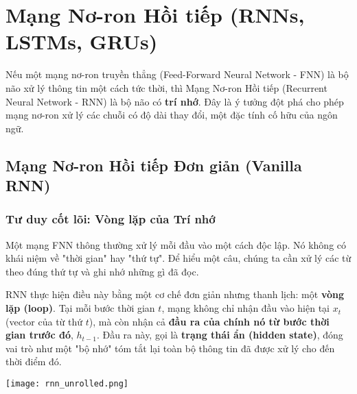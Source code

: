 
\section{Mạng Nơ-ron Hồi tiếp (RNNs, LSTMs, GRUs)}
\label{sec:rnns}

Nếu một mạng nơ-ron truyền thẳng (Feed-Forward Neural Network - FNN) là bộ não xử lý thông tin một cách tức thời, thì Mạng Nơ-ron Hồi tiếp (Recurrent Neural Network - RNN) là bộ não có \textbf{trí nhớ}. Đây là ý tưởng đột phá cho phép mạng nơ-ron xử lý các chuỗi có độ dài thay đổi, một đặc tính cố hữu của ngôn ngữ.

\subsection{Mạng Nơ-ron Hồi tiếp Đơn giản (Vanilla RNN)}
\label{ssec:vanilla_rnn}

\subsubsection{Tư duy cốt lõi: Vòng lặp của Trí nhớ}
Một mạng FNN thông thường xử lý mỗi đầu vào một cách độc lập. Nó không có khái niệm về "thời gian" hay "thứ tự". Để hiểu một câu, chúng ta cần xử lý các từ theo đúng thứ tự và ghi nhớ những gì đã đọc.

RNN thực hiện điều này bằng một cơ chế đơn giản nhưng thanh lịch: một \textbf{vòng lặp (loop)}. Tại mỗi bước thời gian $t$, mạng không chỉ nhận đầu vào hiện tại $x_t$ (vector của từ thứ $t$), mà còn nhận cả \textbf{đầu ra của chính nó từ bước thời gian trước đó}, $h_{t-1}$. Đầu ra này, gọi là \textbf{trạng thái ẩn (hidden state)}, đóng vai trò như một "bộ nhớ" tóm tắt lại toàn bộ thông tin đã được xử lý cho đến thời điểm đó.

\begin{center}
    \texttt{[image: rnn\_unrolled.png]}
    \label{fig:rnn_unrolled}
\end{center}

